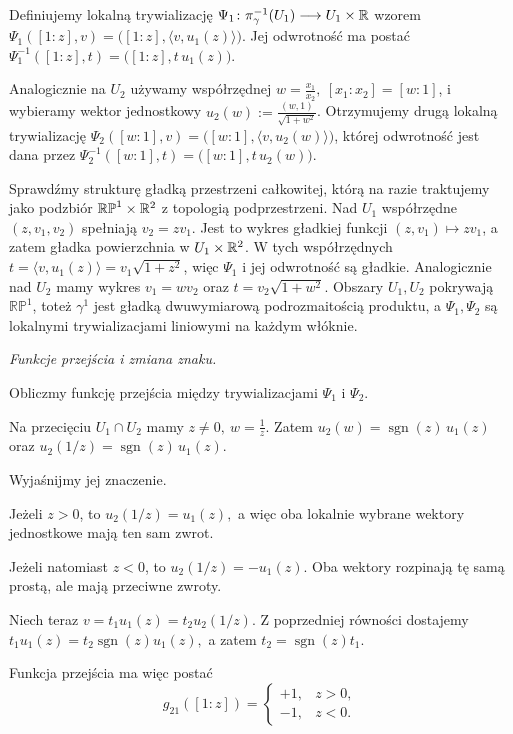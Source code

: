 \begin{przyklad}
Definiujemy lokalną trywializację
$
\Psi_1\colon
\pi_\gamma^{-1}(U_1)\longrightarrow U_1\times\mathbb{R}
$
wzorem $\Psi_1([1:z],v) = \bigl([1:z],\langle v,u_1(z)\rangle\bigr)$.
Jej odwrotność ma postać $\Psi_1^{-1}([1:z],t) = \bigl([1:z],t\,u_1(z)\bigr)$.

Analogicznie na $U_2$ używamy współrzędnej $w=\frac{x_1}{x_2}, \ [x_1:x_2]=[w:1]$,
i wybieramy wektor jednostkowy $u_2(w):=\frac{(w,1)}{\sqrt{1+w^2}}$.
Otrzymujemy drugą lokalną trywializację $\Psi_2([w:1],v) = \bigl([w:1],\langle v,u_2(w)\rangle\bigr)$,
której odwrotność jest dana przez $\Psi_2^{-1}([w:1],t) = \bigl([w:1],t\,u_2(w)\bigr)$.

Sprawdźmy strukturę gładką przestrzeni całkowitej,
którą na razie traktujemy jako podzbiór
$\mathbb{RP}^1\times\mathbb{R}^2$ z topologią podprzestrzeni.
Nad $U_1$ współrzędne $(z,v_1,v_2)$ spełniają
$v_2=zv_1$. Jest to wykres gładkiej funkcji
$(z,v_1)\mapsto zv_1$, a zatem gładka powierzchnia
w $U_1\times\mathbb{R}^2$. W tych współrzędnych
$t=\langle v,u_1(z)\rangle=v_1\sqrt{1+z^2}$,
więc $\Psi_1$ i jej odwrotność są gładkie.
Analogicznie nad $U_2$ mamy wykres $v_1=wv_2$
oraz $t=v_2\sqrt{1+w^2}$. Obszary $U_1,U_2$
pokrywają $\mathbb{RP}^1$, toteż $\gamma^1$
jest gładką dwuwymiarową podrozmaitością produktu,
a $\Psi_1,\Psi_2$ są lokalnymi trywializacjami
liniowymi na każdym włóknie.

\medskip
\emph{Funkcje przejścia i zmiana znaku.}

Obliczmy funkcję przejścia między
trywializacjami $\Psi_1$ i $\Psi_2$.

Na przecięciu $U_1\cap U_2$ mamy $z\neq0, \ w=\frac1z$.
Zatem
$
u_2(w)=\operatorname{sgn}(z)\,u_1(z)
$
oraz
$
u_2(1/z)=\operatorname{sgn}(z)\,u_1(z).
$

Wyjaśnijmy jej znaczenie.

Jeżeli $z>0$, to
$
u_2(1/z)=u_1(z),
$
a więc oba lokalnie wybrane wektory jednostkowe
mają ten sam zwrot.

Jeżeli natomiast $z<0$, to
$
u_2(1/z)=-u_1(z).
$
Oba wektory rozpinają tę samą prostą,
ale mają przeciwne zwroty.

Niech teraz
$
v=t_1u_1(z)=t_2u_2(1/z).
$
Z poprzedniej równości dostajemy
$
t_1u_1(z)
=
t_2\operatorname{sgn}(z)u_1(z),
$
a zatem
$
t_2=\operatorname{sgn}(z)t_1.
$

Funkcja przejścia ma więc postać
\[
\boxed{
g_{21}([1:z])
=
\begin{cases}
+1,&z>0,\\
-1,&z<0.
\end{cases}
}
\]


\end{przyklad}
